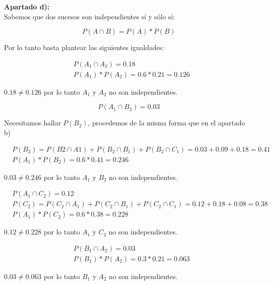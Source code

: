 \documentclass[11pt]{article}
\begin{document}
\begin{justify}
  \textbf{Apartado d):} \\
  Sabemos que dos sucesos son independientes sí y sólo sí:
\end{justify}
\begin{equation*}
  P(A \cap B) = P(A) * P(B)
\end{equation*}
\begin{justify}
  Por lo tanto basta plantear las siguientes igualdades:
\end{justify}
\begin{align*}
  &P(A_1 \cap A_2) = 0.18 \\
  &P(A_1) * P(A_2) = 0.6 * 0.21 = 0.126
\end{align*}
\begin{justify}
  $0.18 \neq 0.126$ por lo tanto $A_1$ y $A_2$ no son independientes.
\end{justify}

\begin{equation*}
  P(A_1 \cap B_2) = 0.03
\end{equation*}
\begin{justify}
  Necesitamos hallar $P(B_2)$, procedemos de la misma forma que en el apartado b)
\end{justify}
\begin{align*}
  &P(B_2) = P(B2 \cap A1) + P(B_2 \cap B_1) + P(B_2 \cap C_1) = 0.03 + 0.09 + 0.18 = 0.41 \\
  &P(A_1) * P(B_2) = 0.6 * 0.41 = 0.246
\end{align*}
\begin{justify}
  $0.03 \neq 0.246$ por lo tanto $A_1$ y $B_2$ no son independientes.
\end{justify}

\begin{align*}
  &P(A_1 \cap C_2) = 0.12\\
  &P(C_2) = P(C_2 \cap A_1) + P(C_2 \cap B_1) + P(C_2 \cap C_1) = 0.12 + 0.18 + 0.08 = 0.38 \\
  &P(A_1) * P(C_2) = 0.6 * 0.38 = 0.228
\end{align*}
\begin{justify}
  $0.12 \neq 0.228$ por lo tanto $A_1$ y $C_2$ no son independientes.
\end{justify}

\begin{align*}
  &P(B_1 \cap A_2) = 0.03 \\
  &P(B_1) * P(A_2) = 0.3 * 0.21 = 0.063
\end{align*}
\begin{justify}
  $0.03 \neq 0.063$ por lo tanto $B_1$ y $A_2$ no son independientes.
\end{justify}
\end{document}
